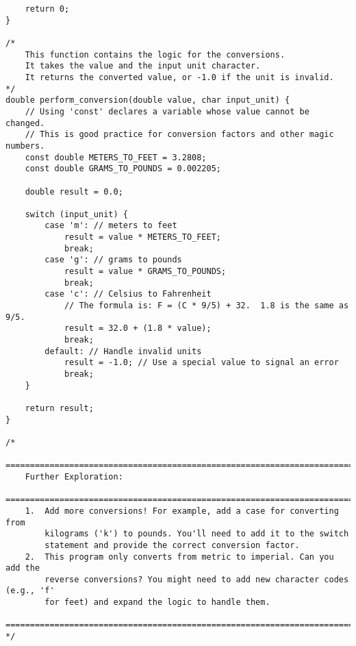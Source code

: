 \documentclass[11pt]{book}
\begin{document}
\begin{verbatim}
    return 0;
}

/*
    This function contains the logic for the conversions.
    It takes the value and the input unit character.
    It returns the converted value, or -1.0 if the unit is invalid.
*/
double perform_conversion(double value, char input_unit) {
    // Using 'const' declares a variable whose value cannot be changed.
    // This is good practice for conversion factors and other magic numbers.
    const double METERS_TO_FEET = 3.2808;
    const double GRAMS_TO_POUNDS = 0.002205;

    double result = 0.0;

    switch (input_unit) {
        case 'm': // meters to feet
            result = value * METERS_TO_FEET;
            break;
        case 'g': // grams to pounds
            result = value * GRAMS_TO_POUNDS;
            break;
        case 'c': // Celsius to Fahrenheit
            // The formula is: F = (C * 9/5) + 32.  1.8 is the same as 9/5.
            result = 32.0 + (1.8 * value);
            break;
        default: // Handle invalid units
            result = -1.0; // Use a special value to signal an error
            break;
    }

    return result;
}

/*
    ================================================================================
    Further Exploration:
    ================================================================================
    1.  Add more conversions! For example, add a case for converting from
        kilograms ('k') to pounds. You'll need to add it to the switch
        statement and provide the correct conversion factor.
    2.  This program only converts from metric to imperial. Can you add the
        reverse conversions? You might need to add new character codes (e.g., 'f'
        for feet) and expand the logic to handle them.
    ================================================================================
*/

\end{verbatim}
\end{document}
